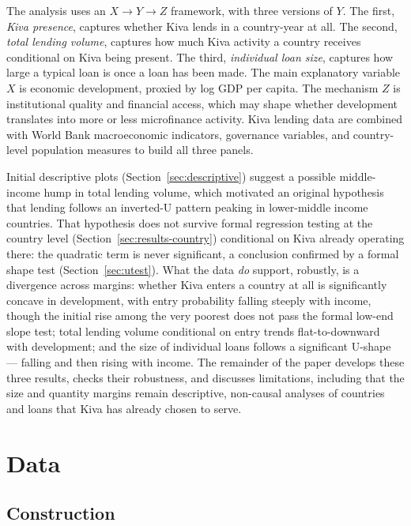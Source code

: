 \documentclass[12pt]{article}
\begin{document}
The analysis uses an $X \to Y \to Z$ framework, with three versions of $Y$. The first, \emph{Kiva
presence}, captures whether Kiva lends in a country-year at all. The second, \emph{total lending
volume}, captures how much Kiva activity a country receives conditional on Kiva being present. The
third, \emph{individual loan size}, captures how large a typical loan is once a loan has been made.
The main explanatory variable $X$ is economic development, proxied by log GDP per capita. The
mechanism $Z$ is institutional quality and financial access, which may shape whether development
translates into more or less microfinance activity. Kiva lending data are combined with World Bank
macroeconomic indicators, governance variables, and country-level population measures to build all
three panels.

Initial descriptive plots (Section~\ref{sec:descriptive}) suggest a possible middle-income hump in
total lending volume, which motivated an original hypothesis that lending follows an inverted-U
pattern peaking in lower-middle income countries. That hypothesis does not survive formal regression
testing at the country level (Section~\ref{sec:results-country}) conditional on Kiva already operating
there: the quadratic term is never significant, a conclusion confirmed by a formal shape test
(Section~\ref{sec:utest}). What the data \emph{do} support, robustly, is a divergence across margins:
whether Kiva enters a country at all is significantly concave in development, with entry probability
falling steeply with income, though the initial rise among the very poorest does not pass the formal
low-end slope test; total lending volume conditional on entry trends flat-to-downward with
development; and the size of individual loans follows a significant U-shape --- falling and then
rising with income. The remainder of the paper develops these three results, checks their robustness,
and discusses limitations, including that the size and quantity margins remain descriptive, non-causal
analyses of countries and loans that Kiva has already chosen to serve.

\section{Data}
\label{sec:data}

\subsection{Construction}
\end{document}

